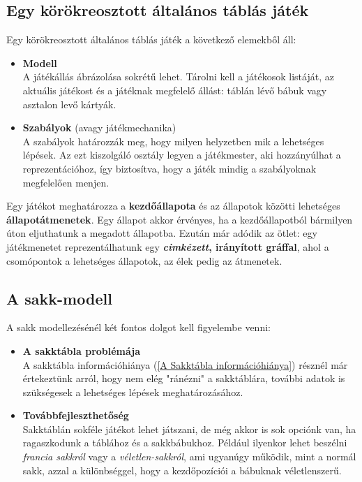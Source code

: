 \documentclass[twoside, a4paper, 12pt]{book}
\begin{document}
\subsection{Egy körökreosztott általános táblás játék}
Egy körökreosztott általános táblás játék a következő elemekből áll:

\begin{itemize}
	\item \textbf{Modell} \\
	A játékállás ábrázolása sokrétű lehet. Tárolni kell a játékosok listáját, az aktuális játékost és a játéknak megfelelő állást: táblán lévő bábuk vagy asztalon levő kártyák.
	
	\item \textbf{Szabályok} (avagy játékmechanika) \\
	A szabályok határozzák meg, hogy milyen helyzetben mik a lehetséges lépések. Az ezt kiszolgáló osztály legyen a játékmester, aki hozzányúlhat a reprezentációhoz, így biztosítva, hogy a játék mindig a szabályoknak megfelelően menjen.
\end{itemize}

Egy játékot meghatározza a \textbf{kezdőállapota} és az állapotok közötti lehetséges \textbf{állapotátmenetek}. Egy állapot akkor érvényes, ha a kezdőállapotból bármilyen úton eljuthatunk a megadott állapotba. Ezután már adódik az ötlet: egy játékmenetet reprezentálhatunk egy \textbf{\textit{cimkézett}, irányított gráffal}, ahol a csomópontok a lehetséges állapotok, az élek pedig az átmenetek.

\subsection{A sakk-modell}
A sakk modellezésénél két fontos dolgot kell figyelembe venni:
\begin{itemize}
	\item \textbf{A sakktábla problémája} \\
	A sakktábla információhiánya (\ref{A Sakktábla információhiánya}) résznél már értekeztünk arról, hogy nem elég "ránézni" a sakktáblára, további adatok is szükségesek a lehetséges lépések meghatározásához.
	
	\item \textbf{Továbbfejleszthetőség} \\
	Sakktáblán sokféle játékot lehet játszani, de még akkor is sok opciónk van, ha ragaszkodunk a táblához és a sakkbábukhoz. Például ilyenkor lehet beszélni \textit{francia sakkról} vagy a \textit{véletlen-sakkról}, ami ugyanúgy működik, mint a normál sakk, azzal a különbséggel, hogy a kezdőpozíciói a bábuknak véletlenszerű.
\end{itemize}
\end{document}
